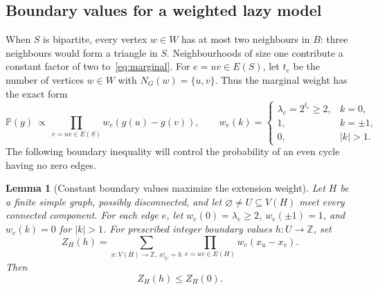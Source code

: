 \documentclass[11pt,reqno]{amsart}
\newtheorem{lemma}[theorem]{Lemma}
\theoremstyle{remark}
\numberwithin{equation}{section}
\newcommand{\Z}{\mathbb Z}
\newcommand{\PP}{\mathbb P}
\begin{document}
\subsection{Boundary values for a weighted lazy model}

When $S$ is bipartite, every vertex $w\in W$ has at most two neighbours
in $B$: three neighbours would form a triangle in $S$. Neighbourhoods of
size one contribute a constant factor of two to~\eqref{eq:marginal}.
For $e=uv\in E(S)$, let $t_e$ be the number of vertices $w\in W$ with
$N_G(w)=\{u,v\}$. Thus the marginal weight has the exact form
\begin{equation}\label{eq:edge-model}
 \PP(g)\ \propto\ \prod_{e=uv\in E(S)}w_e(g(u)-g(v)),\qquad
 w_e(k)=
 \begin{cases}
 \lambda_e=2^{t_e}\ge2,&k=0,\\
 1,&k=\pm1,\\
 0,&|k|>1.
 \end{cases}
\end{equation}
The following boundary inequality will control the probability of an
even cycle having no zero edges.

\begin{lemma}[Constant boundary values maximize the extension weight]
\label{lem:boundary}
Let $H$ be a finite simple graph, possibly disconnected, and let
$\varnothing\ne U\subseteq V(H)$ meet every connected component. For each edge $e$,
let $w_e(0)=\lambda_e\ge2$, $w_e(\pm1)=1$, and $w_e(k)=0$ for
$|k|>1$. For prescribed integer boundary values $h:U\to\Z$, set
\[
 Z_H(h)=\sum_{x:V(H)\to\Z,\ x|_U=h}
             \prod_{e=uv\in E(H)}w_e(x_u-x_v).
\]
Then
\begin{equation}\label{eq:boundary}
 Z_H(h)\le Z_H(0).
\end{equation}
\end{lemma}
\end{document}
